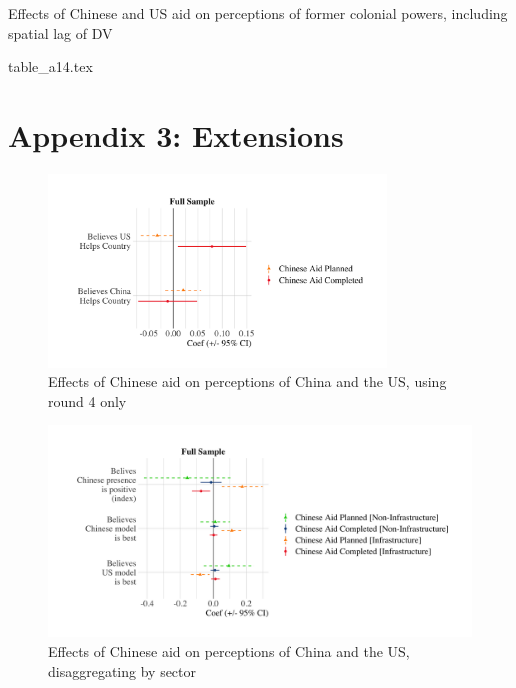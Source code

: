 \documentclass[9pt]{article}
\begin{document}
\setlength{\tabcolsep}{5pt}
\begin{table}[H]
\caption{Effects of Chinese and US aid on perceptions of former colonial powers, including spatial lag of DV}
\label{reg}
\centering
{table_a14.tex}
\end{table}

\newpage
\section{Appendix 3: Extensions}

\begin{figure}[H]
\centering
\includegraphics[width=0.8\textwidth]{figures/figure_a16.png}
\caption{Effects of Chinese aid on perceptions of China and the US, using round 4 only}
\end{figure}

\begin{figure}[H]
\centering
\includegraphics[width=1\textwidth]{figures/figure_a17.png}
\caption{Effects of Chinese aid on perceptions of China and the US, disaggregating by sector}
\end{figure}
\end{document}
